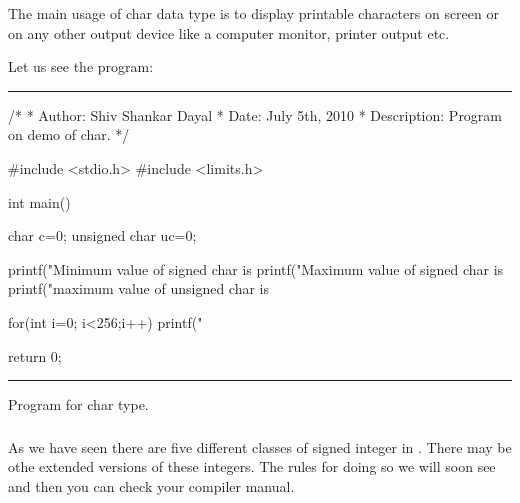 The main usage of char data type is to display printable characters on screen or
on any other output device like a computer monitor, printer output etc.

Let us see the program:
\blank[force,1mm]\hrule\blank[force,1mm]
\startCPP
/*
 * Author: Shiv Shankar Dayal
 * Date: July 5th, 2010
 * Description: Program on demo of char.
 */

#include <stdio.h>
#include <limits.h>

int main()
{
  char c={0};
  unsigned char uc={0};

  printf("Minimum value of signed char is %
  printf("Maximum value of signed char is %
  printf("maximum value of unsigned char is %

  for(int i=0; i<256;i++)
    {
      printf("%
    }

  return 0;
}
\stopCPP
{}
\hrule
\blank[force,1mm]
\startalignment[middle]
Program for char type.
\stopalignment

\subsubsection{}
As we have seen there are five different classes of signed integer in 
. There may be othe extended versions of these
integers. The rules for doing so we will soon see and then you can check your
compiler manual.
